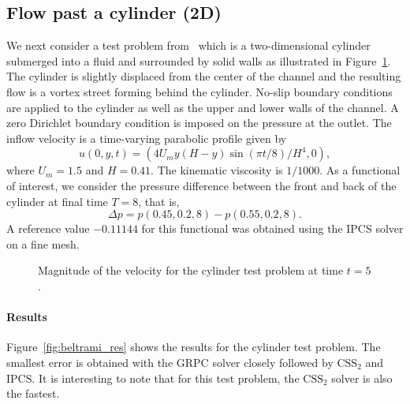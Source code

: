 \subsection{Flow past a cylinder (2D)}

We next consider a test problem from~\cite{Turek1996} which is a
two-dimensional cylinder submerged into a fluid and surrounded by
solid walls as illustrated in
Figure~\ref{fig:cylinder_illustration}. The cylinder is slightly
displaced from the center of the channel and the resulting flow is a
vortex street forming behind the cylinder. No-slip boundary conditions
are applied to the cylinder as well as the upper and lower walls of
the channel. A zero Dirichlet boundary condition is imposed on the
pressure at the outlet. The inflow velocity is a time-varying
parabolic profile given by
\begin{equation} \label{eq:cyl_inflow}
  u(0, y, t) = (4 U_m y (H - y) \sin(\pi t/8)/H^{4}, 0),
\end{equation}
where $U_m = 1.5$ and $H = 0.41$. The kinematic viscosity is $1/1000$.
As a functional of interest, we consider the pressure difference
between the front and back of the cylinder at final time $T = 8$, that
is,
\begin{equation}\label{eq:dp}
  \Delta p = p(0.45, 0.2, 8) - p(0.55, 0.2, 8).
\end{equation}
A reference value $-0.11144$ for this functional was obtained using
the IPCS solver on a fine mesh.

\begin{figure}
  \begin{center}
    \caption{Magnitude of the velocity for the cylinder test problem at
      time $t = 5$.}
    \label{fig:cylinder_illustration}
  \end{center}
\end{figure}

\paragraph{Results}

Figure~\ref{fig:beltrami_res} shows the results for the cylinder test
problem. The smallest error is obtained with the GRPC solver closely
followed by $\mathrm{CSS}_2$ and IPCS. It is interesting to note that
for this test problem, the $\mathrm{CSS}_2$ solver is also the
fastest.

